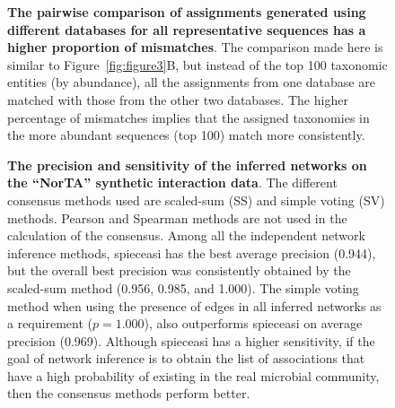 \documentclass[letterpaper,12pt]{article}
\begin{document}
    \begin{figure}[H]
      \centering
        \caption{
          \textbf{The pairwise comparison of assignments generated using different databases for all representative sequences has a higher proportion of mismatches}.
          The comparison made here is similar to Figure~\ref{fig:figure3}B, but instead of the top 100 taxonomic entities (by abundance), all the assignments from one database are matched with those from the other two databases.
          The higher percentage of mismatches implies that the assigned taxonomies in the more abundant sequences (top 100) match more consistently.
        }
      \label{fig:figure_s4}
    \end{figure}

  \begin{figure}[H]
    \centering
      \caption{
        \textbf{The precision and sensitivity of the inferred networks on the ``NorTA'' synthetic interaction data}.
        The different consensus methods used are scaled-sum (SS) and simple voting (SV) methods.
        Pearson and Spearman methods are not used in the calculation of the consensus.
        Among all the independent network inference methods, \acs{spieceasi} has the best average precision (0.944), but the overall best precision was consistently obtained by the scaled-sum method (0.956, 0.985, and 1.000).
        The simple voting method when using the presence of edges in all inferred networks as a requirement ($p = 1.000$), also outperforms \acs{spieceasi} on average precision (0.969).
        Although \acs{spieceasi} has a higher sensitivity, if the goal of network inference is to obtain the list of associations that have a high probability of existing in the real microbial community, then the consensus methods perform better.
      }
    \label{fig:figure_s5}
  \end{figure}
\end{document}

